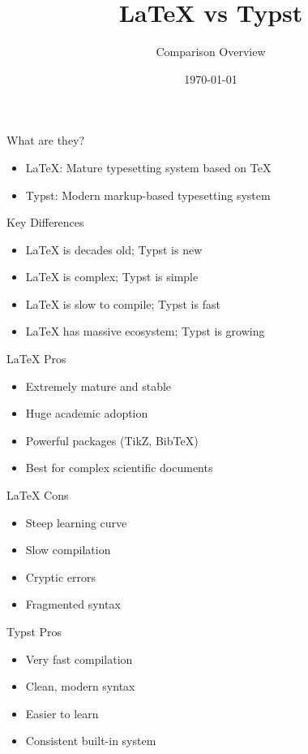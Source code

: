 \documentclass{beamer}
\title{LaTeX vs Typst}
\author{Comparison Overview}
\date{\today}
\begin{document}
\frame{\titlepage}

\begin{frame}{What are they?}
\begin{itemize}
  \item LaTeX: Mature typesetting system based on TeX
  \item Typst: Modern markup-based typesetting system
\end{itemize}
\end{frame}

\begin{frame}{Key Differences}
\begin{itemize}
  \item LaTeX is decades old; Typst is new
  \item LaTeX is complex; Typst is simple
  \item LaTeX is slow to compile; Typst is fast
  \item LaTeX has massive ecosystem; Typst is growing
\end{itemize}
\end{frame}

\begin{frame}{LaTeX Pros}
\begin{itemize}
  \item Extremely mature and stable
  \item Huge academic adoption
  \item Powerful packages (TikZ, BibTeX)
  \item Best for complex scientific documents
\end{itemize}
\end{frame}

\begin{frame}{LaTeX Cons}
\begin{itemize}
  \item Steep learning curve
  \item Slow compilation
  \item Cryptic errors
  \item Fragmented syntax
\end{itemize}
\end{frame}

\begin{frame}{Typst Pros}
\begin{itemize}
  \item Very fast compilation
  \item Clean, modern syntax
  \item Easier to learn
  \item Consistent built-in system
\end{itemize}
\end{frame}
\end{document}
